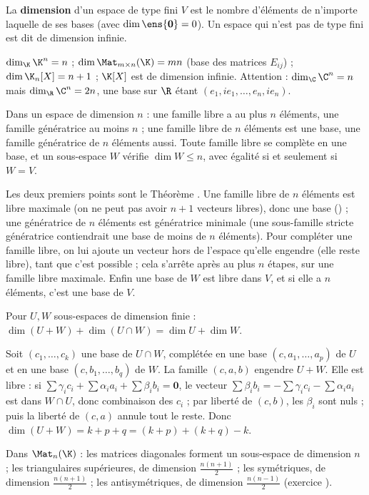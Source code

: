 \begin{definition}[Dimension]
La \textbf{dimension} d'un espace de type fini $V$ est le nombre d'éléments de n'importe laquelle de ses bases (avec $\dim\ens{\mathbf 0}=0$). Un espace qui n'est pas de type fini est dit de dimension infinie.
\end{definition}
\begin{exemple}
$\dim_{\K}\K^n=n$ ; $\dim\Mat_{m\times n}(\K)=mn$ (base des matrices $E_{ij}$) ; $\dim\K_n[X]=n+1$ ; $\K[X]$ est de dimension infinie. Attention : $\dim_{\C}\C^n=n$ mais $\dim_{\R}\C^n=2n$, une base sur $\R$ étant $(e_1,ie_1,\dots,e_n,ie_n)$.
\end{exemple}
\begin{corollaire}\label{cor-compter}
Dans un espace de dimension $n$ : une famille libre a au plus $n$ éléments, une famille génératrice au moins $n$ ; une famille libre de $n$ éléments est une base, une famille génératrice de $n$ éléments aussi. Toute famille libre se complète en une base, et un sous-espace $W$ vérifie $\dim W\le n$, avec égalité si et seulement si $W=V$.
\end{corollaire}
\begin{preuve}
Les deux premiers points sont le Théorème . Une famille libre de $n$ éléments est libre maximale (on ne peut pas avoir $n+1$ vecteurs libres), donc une base () ; une génératrice de $n$ éléments est génératrice minimale (une sous-famille stricte génératrice contiendrait une base de moins de $n$ éléments). Pour compléter une famille libre, on lui ajoute un vecteur hors de l'espace qu'elle engendre (elle reste libre), tant que c'est possible ; cela s'arrête après au plus $n$ étapes, sur une famille libre maximale. Enfin une base de $W$ est libre dans $V$, et si elle a $n$ éléments, c'est une base de $V$.
\end{preuve}
\begin{proposition}\label{prop-grassmann}
Pour $U,W$ sous-espaces de dimension finie : $\dim(U+W)+\dim(U\cap W)=\dim U+\dim W$.
\end{proposition}
\begin{preuve}
Soit $(c_1,\dots,c_k)$ une base de $U\cap W$, complétée en une base $(c,a_1,\dots,a_p)$ de $U$ et en une base $(c,b_1,\dots,b_q)$ de $W$. La famille $(c,a,b)$ engendre $U+W$. Elle est libre : si $\sum\gamma_ic_i+\sum\alpha_ia_i+\sum\beta_ib_i=\mathbf 0$, le vecteur $\sum\beta_ib_i=-\sum\gamma_ic_i-\sum\alpha_ia_i$ est dans $W\cap U$, donc combinaison des $c_i$ ; par liberté de $(c,b)$, les $\beta_i$ sont nuls ; puis la liberté de $(c,a)$ annule tout le reste. Donc $\dim(U+W)=k+p+q=(k+p)+(k+q)-k$.
\end{preuve}
\begin{proposition}
Dans $\Mat_n(\K)$ : les matrices diagonales forment un sous-espace de dimension $n$ ; les triangulaires supérieures, de dimension $\frac{n(n+1)}2$ ; les symétriques, de dimension $\frac{n(n+1)}2$ ; les antisymétriques, de dimension $\frac{n(n-1)}2$ (exercice ).
\end{proposition}

